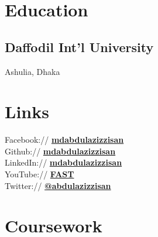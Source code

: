 \documentclass[]{deedy-resume-openfont}
\begin{document}
%
%
\lastupdated

%
%

%
%

\begin{minipage}[t]{0.33\textwidth} 


\section{Education} 

\subsection{Daffodil Int'l University}
Ashulia, Dhaka\\
\sectionsep



\section{Links} 
Facebook:// \href{https://facebook.com/mdabdulazizzisan}{\bf mdabdulazizzisan} \\
Github:// \href{https://github.com/mdabdulazizzisan}{\bf mdabdulazizzisan} \\
LinkedIn://  \href{https://www.linkedin.com/in/mdabdulazizzisan}{\bf mdabdulazizzisan} \\
YouTube://  \href{ https://www.youtube.com/@FreeAltSoftwareTutorials }{\bf FAST} \\
Twitter://  \href{https://twitter.com/abdulazizzisan}{\bf @abdulazizzisan} \\


\section{Coursework}

\end{minipage}
\end{document}
